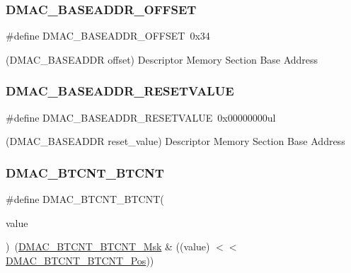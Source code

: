 \subsubsection{\texorpdfstring{DMAC\_BASEADDR\_OFFSET}{DMAC\_BASEADDR\_OFFSET}}
{\footnotesize\ttfamily \#define D\+M\+A\+C\+\_\+\+B\+A\+S\+E\+A\+D\+D\+R\+\_\+\+O\+F\+F\+S\+ET~0x34}



(D\+M\+A\+C\+\_\+\+B\+A\+S\+E\+A\+D\+DR offset) Descriptor Memory Section Base Address 

\mbox{\label{group___s_a_m_d21___d_m_a_c_gaa7adfed5ff6555d1383e197e38eb3391}} 
\subsubsection{\texorpdfstring{DMAC\_BASEADDR\_RESETVALUE}{DMAC\_BASEADDR\_RESETVALUE}}
{\footnotesize\ttfamily \#define D\+M\+A\+C\+\_\+\+B\+A\+S\+E\+A\+D\+D\+R\+\_\+\+R\+E\+S\+E\+T\+V\+A\+L\+UE~0x00000000ul}



(D\+M\+A\+C\+\_\+\+B\+A\+S\+E\+A\+D\+DR reset\+\_\+value) Descriptor Memory Section Base Address 

\mbox{\label{group___s_a_m_d21___d_m_a_c_ga623b5a6ab529d933a20cb283eb13dc2a}} 
\subsubsection{\texorpdfstring{DMAC\_BTCNT\_BTCNT}{DMAC\_BTCNT\_BTCNT}}
{\footnotesize\ttfamily \#define D\+M\+A\+C\+\_\+\+B\+T\+C\+N\+T\+\_\+\+B\+T\+C\+NT(\begin{DoxyParamCaption}\item[{}]{value }\end{DoxyParamCaption})~(\mbox{\hyperlink{group___s_a_m_d21___d_m_a_c_ga5782a95fe2f03ef099907901c9abf32b}{D\+M\+A\+C\+\_\+\+B\+T\+C\+N\+T\+\_\+\+B\+T\+C\+N\+T\+\_\+\+Msk}} \& ((value) $<$$<$ \mbox{\hyperlink{group___s_a_m_d21___d_m_a_c_gafce48654ec425cf0d3c01e6b8d766945}{D\+M\+A\+C\+\_\+\+B\+T\+C\+N\+T\+\_\+\+B\+T\+C\+N\+T\+\_\+\+Pos}}))}

